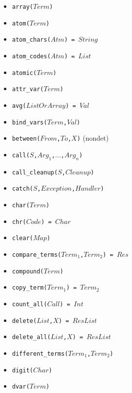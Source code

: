 \documentclass[10pt]{article}
\begin{document}
\begin{multicols}{2}
\begin{scriptsize}
\begin{itemize}
    \item \texttt{array($Term$)} 
    \item \texttt{atom($Term$)} 
    \item \texttt{atom\_chars($Atm$) = $String$}
    \item \texttt{atom\_codes($Atm$) = $List$} 
    \item \texttt{atomic($Term$)} 
    \item \texttt{attr\_var($Term$)} 
    \item \texttt{avg($ListOrArray$) = $Val$}
    \item \texttt{bind\_vars($Term$,$Val$)}
    \item \texttt{between($From$,$To$,$X$)} (nondet)
    \item \texttt{call($S$,$Arg_1$,$\ldots$,$Arg_n$)} 
    \item \texttt{call\_cleanup($S$,$Cleanup$)} 
    \item \texttt{catch($S$,$Exception$,$Handler$)} 
    \item \texttt{char($Term$)} 
    \item \texttt{chr($Code$) = $Char$} 
    \item \texttt{clear($Map$)} 
    \item \texttt{compare\_terms($Term_1$,$Term_2$) = $Res$} 
    \item \texttt{compound($Term$)} 
    \item \texttt{copy\_term($Term_1$) = $Term_2$}
    \item \texttt{count\_all($Call$) = $Int$}
    \item \texttt{delete($List$,$X$) = $ResList$}
    \item \texttt{delete\_all($List$,$X$) = $ResList$}
    \item \texttt{different\_terms($Term_1$,$Term_2$)}
    \item \texttt{digit($Char$)}
    \item \texttt{dvar($Term$)}

\end{itemize}
\end{scriptsize}
\end{multicols}
\end{document}
